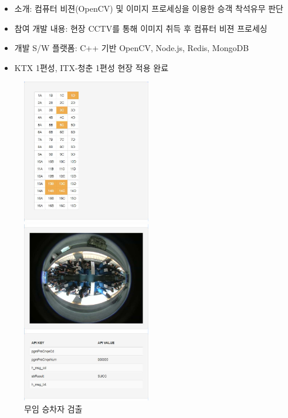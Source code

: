 \documentclass[10pt,a4paper,ragged2e]{altacv}
\begin{document}
\begin{fullwidth}
\divider


\begin{itemize}
\item 소개: 컴퓨터 비젼(OpenCV) 및 이미지 프로세싱을 이용한 승객 착석유무 판단
\item 참여 개발 내용: 현장 CCTV를 통해 이미지 취득 후 컴퓨터 비젼 프로세싱
\item 개발 S/W 플랫폼: C++ 기반 OpenCV, Node.js, Redis, MongoDB
\item KTX 1편성, ITX-청춘 1편성 현장 적용 완료
\end{itemize}

\begin{figure}[!ht]
  \begin{fullwidth}
    \parbox{0.5\textwidth}{
    \centering
    \includegraphics[width=0.5\textwidth]{images/korail_seat_01_01.png}
    \caption*{무임 승차자 검출}
    }\qquad
    \parbox{0.5\textwidth}{
    \centering
    \includegraphics[width=0.5\textwidth]{images/korail_seat_01_02.png}
}
\end{fullwidth}
\end{figure}
\end{fullwidth}
\end{document}
